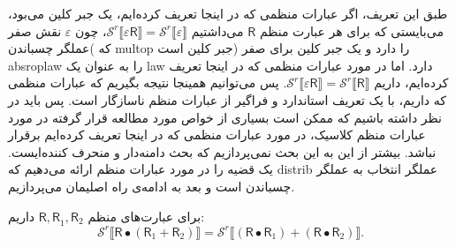 طبق این تعریف، اگر عبارات منظمی که در اینجا تعریف کرده‌ایم، یک جبر کلین می‌بود، می‌بایستی که برای هر عبارت منظم $\mathsf{R}$ می‌داشتیم
$\mathcal{S}^r \llbracket \mathsf{\varepsilon R} \rrbracket = \mathcal{S}^r \llbracket \mathsf{\varepsilon} \rrbracket$،
چون $\varepsilon$ نقش صفر عملگر چسباندن( که \gls*{multop} جبر کلین است) را دارد و یک جبر کلین برای صفر \gls*{absroplaw} را به عنوان یک \gls*{law} دارد. اما در مورد عبارات منظمی که در اینجا تعریف کرده‌ایم، داریم 
$\mathcal{S}^r \llbracket \mathsf{\varepsilon R} \rrbracket = \mathcal{S}^r \llbracket \mathsf{R} \rrbracket$.
پس می‌توانیم همینجا نتیجه بگیریم که عبارات منظمی که داریم، با یک تعریف استاندارد و فراگیر از عبارات منظم ناسازگار است. پس باید در نظر داشته باشیم که ممکن است بسیاری از خواص مورد مطالعه قرار گرفته در مورد عبارات منظم کلاسیک، در مورد عبارات منظمی که در اینجا تعریف کرده‌ایم برقرار نباشد.
بیشتر از این به این بحث نمی‌پردازیم که بحث دامنه‌دار و منحرف کننده‌ایست. یک قضیه را در مورد عبارات منظم ارائه می‌دهیم که \gls*{distrib} عملگر انتخاب به عملگر چسباندن است و بعد به ادامه‌ی راه اصلیمان می‌پردازیم.

\begin{thm}
	برای عبارت‌های منظم
	 $\mathsf{R , R}_1,\mathsf{R}_2$
	 داریم:
	  $$\mathcal{S}^r \llbracket \mathsf{R}\bullet (\mathsf{R}_1 + \mathsf{R}_2) \rrbracket = \mathcal{S}^r \llbracket (\mathsf{R \bullet R}_1) + (\mathsf{R \bullet R}_2) \rrbracket. $$
\end{thm}

